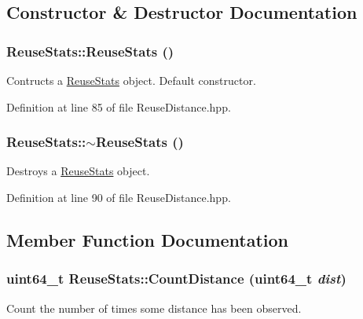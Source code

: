 \subsection{Constructor \& Destructor Documentation}
\hypertarget{class_reuse_stats_a0106660db234ec0ea484c61cb18702e8}{
\subsubsection[{ReuseStats}]{\setlength{\rightskip}{0pt plus 5cm}ReuseStats::ReuseStats ()}}
\label{class_reuse_stats_a0106660db234ec0ea484c61cb18702e8}
Contructs a \hyperlink{class_reuse_stats}{ReuseStats} object. Default constructor. 

Definition at line 85 of file ReuseDistance.hpp.\hypertarget{class_reuse_stats_a21f8a5cab3976edba08c2562c3ed8d45}{
\subsubsection[{$\sim$ReuseStats}]{\setlength{\rightskip}{0pt plus 5cm}ReuseStats::$\sim$ReuseStats ()}}
\label{class_reuse_stats_a21f8a5cab3976edba08c2562c3ed8d45}
Destroys a \hyperlink{class_reuse_stats}{ReuseStats} object. 

Definition at line 90 of file ReuseDistance.hpp.

\subsection{Member Function Documentation}
\hypertarget{class_reuse_stats_abdb92b77ec7191be80e77a34f894e11b}{
\subsubsection[{CountDistance}]{\setlength{\rightskip}{0pt plus 5cm}uint64\_\-t ReuseStats::CountDistance (uint64\_\-t {\em dist})}}
\label{class_reuse_stats_abdb92b77ec7191be80e77a34f894e11b}
Count the number of times some distance has been observed.


